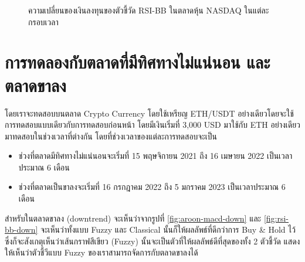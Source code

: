 \begin{figure}[!ht]
    \centering
    \caption{ความเปลี่ยนของเงินลงทุนของตัวชี้วัด RSI-BB ในตลาดหุ้น NASDAQ ในแต่ละกรอบเวลา}
    \label{fig:rsi-bb-stock-all}
\end{figure}

\section{การทดลองกับตลาดที่มีทิศทางไม่แน่นอน และตลาดขาลง}
โดยเราจะทดสอบบนตลาด Crypto Currency โดยใช้เหรียญ ETH/USDT อย่างเดียวโดยจะใช้การทดสอบแบบเดียวกับการทดสอบก่อนหน้า โดยมีเงินเริ่มที่ 3,000 USD มาใช้กับ ETH อย่างเดียวมาทดสอบในช่วงเวลาที่ต่างกัน โดยที่ช่วงเวลาของแต่ละการทดสอบจะเป็น
\begin{itemize}
    \item ช่วงที่ตลาดมีทิศทางไม่แน่นอนจะเริ่มที่ 15 พฤษจิกายน 2021 ถึง 16 เมษายน 2022 เป็นเวลาประมาณ 6 เดือน
    \item ช่วงที่ตลาดเป็นขาลงจะเริ่มที่ 16 กรกฎาคม 2022 ถึง 5 มกราคม 2023 เป็นเวลาประมาณ 6 เดือน 
\end{itemize}
สำหรับในตลาดขาลง (downtrend) จะเห็นว่าจากรูปที่ \ref{fig:aroon-macd-down} และ \ref{fig:rsi-bb-down} จะเห็นว่าทั้งแบบ Fuzzy และ Classical นั้นก็ให้ผลลัพธ์ที่ดีกว่าการ Buy \& Hold ไว้ซึ่งก็จะสังเกตุเห็นว่าเส้นกราฟสีเขียว (Fuzzy) นั้นจะเป็นตัวที่ให้ผลลัพธ์ดีที่สุดของทั้ง 2 ตัวชี้วัด แสดงให้เห็นว่าตัวชี้วีแบบ Fuzzy ของเราสามารถจัดการกับตลาดขาลงได้


